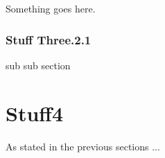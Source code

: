 Something goes here.

\subsubsection{Stuff Three.2.1}
\label{sss:stuff3.2.1}

sub sub section

\section{Stuff4}
\label{s:stuff4}

As stated in the previous sections ...





















